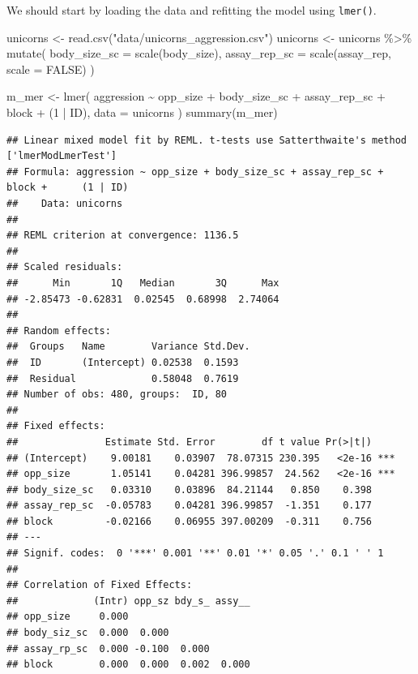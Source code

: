 \documentclass[
  12pt,
]{book}
\newenvironment{Shaded}{\begin{snugshade}}{\end{snugshade}}
\newcommand{\AttributeTok}[1]{\textcolor[rgb]{0.77,0.63,0.00}{#1}}
\newcommand{\ConstantTok}[1]{\textcolor[rgb]{0.00,0.00,0.00}{#1}}
\newcommand{\DecValTok}[1]{\textcolor[rgb]{0.00,0.00,0.81}{#1}}
\newcommand{\FunctionTok}[1]{\textcolor[rgb]{0.00,0.00,0.00}{#1}}
\newcommand{\NormalTok}[1]{#1}
\newcommand{\OtherTok}[1]{\textcolor[rgb]{0.56,0.35,0.01}{#1}}
\newcommand{\SpecialCharTok}[1]{\textcolor[rgb]{0.00,0.00,0.00}{#1}}
\newcommand{\StringTok}[1]{\textcolor[rgb]{0.31,0.60,0.02}{#1}}
\begin{document}
We should start by loading the data and refitting the model using \texttt{lmer()}.

\begin{Shaded}
\begin{Highlighting}[]
\NormalTok{unicorns }\OtherTok{\textless{}{-}} \FunctionTok{read.csv}\NormalTok{(}\StringTok{"data/unicorns\_aggression.csv"}\NormalTok{)}
\NormalTok{unicorns }\OtherTok{\textless{}{-}}\NormalTok{ unicorns }\SpecialCharTok{\%\textgreater{}\%}
  \FunctionTok{mutate}\NormalTok{(}
    \AttributeTok{body\_size\_sc =} \FunctionTok{scale}\NormalTok{(body\_size),}
    \AttributeTok{assay\_rep\_sc =} \FunctionTok{scale}\NormalTok{(assay\_rep, }\AttributeTok{scale =} \ConstantTok{FALSE}\NormalTok{)}
\NormalTok{  )}

\NormalTok{m\_mer }\OtherTok{\textless{}{-}} \FunctionTok{lmer}\NormalTok{(}
\NormalTok{    aggression }\SpecialCharTok{\textasciitilde{}}\NormalTok{ opp\_size }\SpecialCharTok{+}\NormalTok{ body\_size\_sc }\SpecialCharTok{+}\NormalTok{ assay\_rep\_sc }\SpecialCharTok{+}\NormalTok{ block}
      \SpecialCharTok{+}\NormalTok{ (}\DecValTok{1} \SpecialCharTok{|}\NormalTok{ ID),}
    \AttributeTok{data =}\NormalTok{ unicorns}
\NormalTok{)}
\FunctionTok{summary}\NormalTok{(m\_mer)}
\end{Highlighting}
\end{Shaded}

\begin{verbatim}
## Linear mixed model fit by REML. t-tests use Satterthwaite's method ['lmerModLmerTest']
## Formula: aggression ~ opp_size + body_size_sc + assay_rep_sc + block +      (1 | ID)
##    Data: unicorns
## 
## REML criterion at convergence: 1136.5
## 
## Scaled residuals: 
##      Min       1Q   Median       3Q      Max 
## -2.85473 -0.62831  0.02545  0.68998  2.74064 
## 
## Random effects:
##  Groups   Name        Variance Std.Dev.
##  ID       (Intercept) 0.02538  0.1593  
##  Residual             0.58048  0.7619  
## Number of obs: 480, groups:  ID, 80
## 
## Fixed effects:
##               Estimate Std. Error        df t value Pr(>|t|)    
## (Intercept)    9.00181    0.03907  78.07315 230.395   <2e-16 ***
## opp_size       1.05141    0.04281 396.99857  24.562   <2e-16 ***
## body_size_sc   0.03310    0.03896  84.21144   0.850    0.398    
## assay_rep_sc  -0.05783    0.04281 396.99857  -1.351    0.177    
## block         -0.02166    0.06955 397.00209  -0.311    0.756    
## ---
## Signif. codes:  0 '***' 0.001 '**' 0.01 '*' 0.05 '.' 0.1 ' ' 1
## 
## Correlation of Fixed Effects:
##             (Intr) opp_sz bdy_s_ assy__
## opp_size     0.000                     
## body_siz_sc  0.000  0.000              
## assay_rp_sc  0.000 -0.100  0.000       
## block        0.000  0.000  0.002  0.000
\end{verbatim}
\end{document}
